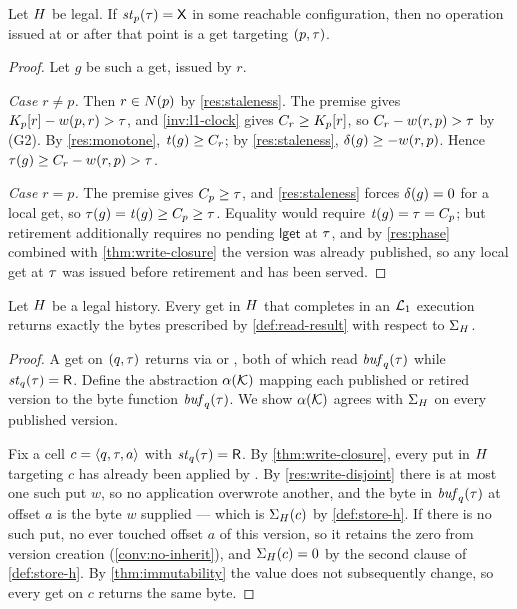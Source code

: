 \begin{theorem}\label{thm:discard-safety}
Let $H$ be legal. If $\mathit{st}_{p}(\tau) = \mathsf{X}$ in some reachable
configuration, then no operation issued at or after that point is a get
targeting $(p,\tau)$.
\end{theorem}

\begin{proof}
Let $g$ be such a get, issued by $r$.

\emph{Case $r \ne p$.} Then $r \in N(p)$ by \cref{res:staleness}. The
 premise gives $K_{p}[r] - w(p,r) > \tau$, and
\cref{inv:l1-clock} gives $C_{r} \ge K_{p}[r]$, so
$C_{r} - w(r,p) > \tau$ by (G2). By \cref{res:monotone},
$\mathit{t}(g) \ge C_{r}$; by \cref{res:staleness},
$\delta(g) \ge -w(r,p)$. Hence
$\tau(g) \ge C_{r} - w(r,p) > \tau$.

\emph{Case $r = p$.} The premise gives $C_{p} \ge \tau$, and
\cref{res:staleness} forces $\delta(g) = 0$ for a local get, so
$\tau(g) = \mathit{t}(g) \ge C_{p} \ge \tau$. Equality would require
$\mathit{t}(g) = \tau = C_{p}$; but retirement additionally requires no pending
$\mathsf{lget}$ at $\tau$, and by \cref{res:phase} combined with
\cref{thm:write-closure} the version was already published, so any local get
at $\tau$ was issued before retirement and has been served.
\end{proof}

\begin{theorem}\label{thm:read-soundness}
Let $H$ be a legal history. Every get in $H$ that completes in an
$\mathcal{L}_1$ execution returns exactly the bytes prescribed by
\cref{def:read-result} with respect to $\Sigma_{H}$.
\end{theorem}

\begin{proof}
A get on $(q,\tau)$ returns via  or ,
both of which read $\mathit{buf}_{q}(\tau)$ while $\mathit{st}_{q}(\tau) = \mathsf{R}$. Define the
abstraction $\alpha(\mathcal{K})$ mapping each published or retired version to the
byte function $\mathit{buf}_{q}(\tau)$. We show $\alpha(\mathcal{K})$ agrees with $\Sigma_{H}$
on every published version.

Fix a \gls{cell} $c = \langle q, \tau, a\rangle$ with $\mathit{st}_{q}(\tau) = \mathsf{R}$. By
\cref{thm:write-closure}, every put in $H$ targeting $c$ has already been
applied by . By \cref{res:write-disjoint} there is at most one
such put $w$, so no application overwrote another, and the byte in
$\mathit{buf}_{q}(\tau)$ at offset $a$ is the byte $w$ supplied --- which is
$\Sigma_{H}(c)$ by \cref{def:store-h}. If there is no such put, no
 ever touched offset $a$ of this version, so it retains the
zero from version creation (\cref{conv:no-inherit}), and
$\Sigma_{H}(c) = 0$ by the second clause of \cref{def:store-h}.
By \cref{thm:immutability} the value does not subsequently change, so every
get on $c$ returns the same byte.
\end{proof}

